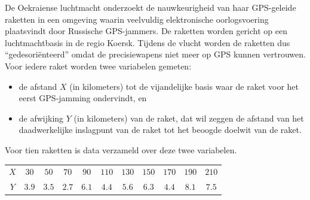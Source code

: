 \begin{question}{30}{
    De Oekraiense luchtmacht onderzoekt de nauwkeurigheid van haar GPS-geleide raketten in een omgeving waarin veelvuldig elektronische oorlogsvoering plaatsvindt door Russische GPS-jammers.
    De raketten worden gericht op een luchtmachtbasis in de regio Koersk.
    Tijdens de vlucht worden de raketten dus ``gedesori\"enteerd'' omdat de precisiewapens niet meer op GPS kunnen vertrouwen.
    Voor iedere raket worden twee variabelen gemeten:
    \begin{itemize}
        \item de afstand $X$ (in kilometers) tot de vijandelijke basis waar de raket voor het eerst GPS-jamming ondervindt, en
        \item de afwijking $Y$ (in kilometers) van de raket, dat wil zeggen de afstand van het daadwerkelijke inslagpunt van de raket tot het beoogde doelwit van de raket.
    \end{itemize}
    Voor tien raketten is data verzameld over deze twee variabelen.
    \begin{center}
        \begin{tabular}{c|cccccccccc}
            \toprule
                \textbf{$X$} & $30$ & $50$ & $70$ & $90$ & $110$ & $130$ & $150$ & $170$ & $190$ & $210$ \\
                \textbf{$Y$} & $3.9$ & $3.5$ & $2.7$ & $6.1$ & $4.4$ & $5.6$ & $6.3$ & $4.4$ & $8.1$ & $7.5$ \\
            \bottomrule
        \end{tabular}
    \end{center}

}



\end{question}
